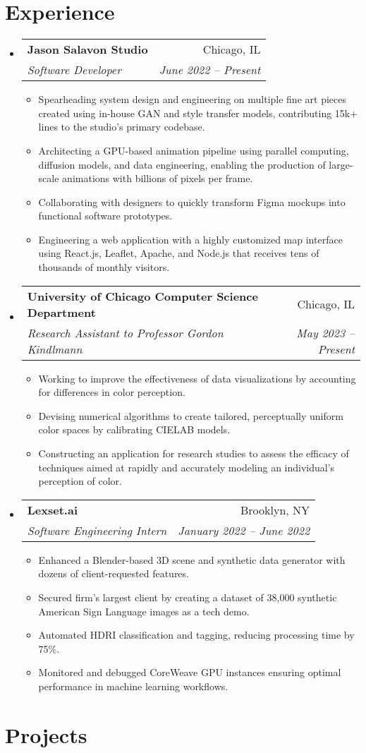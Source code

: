 \documentclass[letterpaper,11pt]{article}
\makeatletter
\newcommand{\resumeItem}[1]{
  \item\small{
    {#1 \vspace{-2pt}}
  }
}
\newcommand{\resumeSubheading}[4]{
  \vspace{-2pt}\item
    \begin{tabular*}{0.97\textwidth}[t]{l@{\extracolsep{\fill}}r}
      \textbf{#1} & #2 \\
      \textit{\small#3} & \textit{\small #4} \\
    \end{tabular*}\vspace{-7pt}
}
\newcommand{\resumeSubHeadingListStart}{\begin{itemize}[leftmargin=0.125in, label={}]}
\newcommand{\resumeSubHeadingListEnd}{\end{itemize}}
\newcommand{\resumeItemListStart}{\begin{itemize}[leftmargin=0.185in]
}
\newcommand{\resumeItemListEnd}{\end{itemize}\vspace{-5pt}}
\makeatother
\begin{document}
\section{Experience}
  \resumeSubHeadingListStart
    \resumeSubheading
      {Jason Salavon Studio}
      {Chicago, IL}
      {Software Developer}
      {June 2022 -- Present}
      \resumeItemListStart
        \resumeItem{Spearheading system design and engineering on multiple fine art pieces created using in-house GAN and style transfer models, contributing 15k+ lines to the studio's primary codebase.}
        \resumeItem{Architecting a GPU-based animation pipeline using parallel computing, diffusion models, and data engineering, enabling the production of large-scale animations with billions of pixels per frame.}
        \resumeItem{Collaborating with designers to quickly transform Figma mockups into functional software prototypes.}
        \resumeItem{Engineering a web application with a highly customized map interface using React.js, Leaflet, Apache, and Node.js that receives tens of thousands of  monthly visitors.}
      \resumeItemListEnd
    \resumeSubheading
      {University of Chicago Computer Science Department}
      {Chicago, IL}
      {Research Assistant to Professor Gordon Kindlmann}
      {May 2023 -- Present}
      \resumeItemListStart
        \resumeItem{Working to improve the effectiveness of data visualizations by accounting for differences in color perception.}
        \resumeItem{Devising numerical algorithms to create tailored, perceptually uniform color spaces by calibrating CIELAB models.}\resumeItem{Constructing an application for research studies to assess the efficacy of techniques aimed at rapidly and accurately modeling an individual's  perception of color.}
      \resumeItemListEnd
    \resumeSubheading
      {Lexset.ai}
      {Brooklyn, NY}
      {Software Engineering Intern}
      {January 2022 -- June 2022}
      \resumeItemListStart
        \resumeItem{Enhanced a Blender-based 3D scene and synthetic data generator with dozens of client-requested features.}
        \resumeItem{Secured firm's largest client by creating a dataset of 38,000 synthetic American Sign Language images as a tech demo.}\resumeItem{Automated HDRI classification and tagging, reducing processing time by 75\%.}
        \resumeItem{Monitored and debugged CoreWeave GPU instances ensuring optimal performance in machine learning workflows. }
      \resumeItemListEnd
  \resumeSubHeadingListEnd

\section{Projects}
\end{document}
